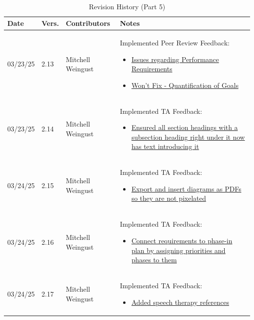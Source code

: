 \documentclass[12pt]{article}
\begin{document}
~\newpage
\begin{table}[H]
  \centering
  \caption{Revision History (Part 5)}
  \label{TblRevisionHistoryPart1}
  \begin{tabularx}{\textwidth}{p{1.5cm} p{1cm} p{3.5cm} X}
      \toprule
      \textbf{Date} & \textbf{Vers.} & \textbf{Contributors} & \textbf{Notes} \\
      \midrule
      03/23/25 & 2.13 & Mitchell Weingust & Implemented Peer Review Feedback:
      \begin{itemize}[leftmargin=*]
        \item \href{https://github.com/parishanizam/TeleHealth/issues/116}{Issues regarding Performance Requirements}
        \item \href{https://github.com/parishanizam/TeleHealth/issues/118}{Won't Fix - Quantification of Goals}
      \end{itemize} \\
      03/23/25 & 2.14 & Mitchell Weingust & Implemented TA Feedback: 
      \begin{itemize}[leftmargin=*]
        \item \href{https://github.com/parishanizam/TeleHealth/issues/191}{Ensured all section headings with a subsection heading right under it now has text introducing it}
      \end{itemize} \\
      03/24/25 & 2.15 & Mitchell Weingust & Implemented TA Feedback: 
      \begin{itemize}[leftmargin=*]
        \item \href{https://github.com/parishanizam/TeleHealth/issues/190}{Export and insert diagrams as PDFs so they are not pixelated}
      \end{itemize} \\
      03/24/25 & 2.16 & Mitchell Weingust & Implemented TA Feedback: 
      \begin{itemize}[leftmargin=*]
        \item \href{https://github.com/parishanizam/TeleHealth/issues/198}{Connect requirements to phase-in plan by assigning priorities and phases to them}
      \end{itemize} \\
      03/24/25 & 2.17 & Mitchell Weingust & Implemented TA Feedback: 
      \begin{itemize}[leftmargin=*]
        \item \href{https://github.com/parishanizam/TeleHealth/issues/208}{Added speech therapy references}

\end{itemize}
\end{tabularx}
\end{table}
\end{document}
